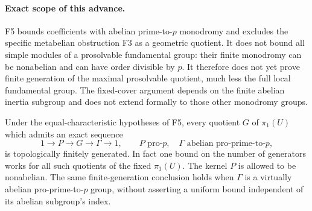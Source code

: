 \paragraph{Exact scope of this advance.}
F5 bounds coefficients with abelian prime-to-$p$ monodromy and
excludes the specific metabelian obstruction F3 as a geometric
quotient. It does not bound all simple modules of a prosolvable
fundamental group: their finite monodromy can be nonabelian and
can have order divisible by $p$. It therefore does not yet prove
finite generation of the maximal prosolvable quotient, much less
the full local fundamental group. The fixed-cover argument depends
on the finite abelian inertia subgroup and does not extend formally
to those other monodromy groups.

\begin{corollary}
Under the equal-characteristic hypotheses of F5, every quotient $G$
of $\pi_1(U)$ which admits an exact sequence
\[
 1\longrightarrow P\longrightarrow G\longrightarrow\Gamma
 \longrightarrow1,
 \qquad P\text{ pro-}p,\quad
 \Gamma\text{ abelian pro-prime-to-}p,
\]
is topologically finitely generated. In fact one bound on the number
of generators works for all such quotients of the fixed $\pi_1(U)$.
The kernel $P$ is allowed to be nonabelian. The same finite-generation
conclusion holds when $\Gamma$ is a virtually abelian pro-prime-to-$p$
group, without asserting a uniform bound independent of its abelian
subgroup's index.
\end{corollary}
